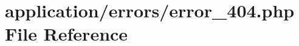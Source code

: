 \hypertarget{error__404_8php}{\section{application/errors/error\-\_\-404.php File Reference}
\label{error__404_8php}
}
